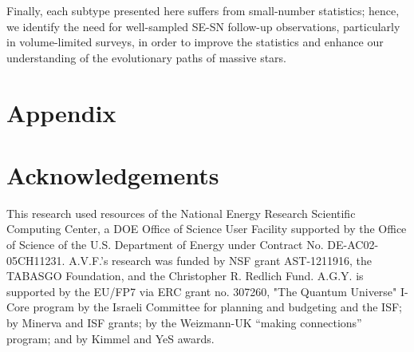 \documentclass[a4paper,fleqn,usenatbib]{mnras}
\begin{document}
Finally, each subtype presented here suffers from small-number statistics; hence, we identify the need for well-sampled SE-SN follow-up observations, particularly in volume-limited surveys, in order to improve the statistics and enhance our understanding of the evolutionary paths of massive stars.


\section{Appendix}


\section*{Acknowledgements}
This research used resources of the National Energy Research Scientific Computing Center, a DOE Office of Science User Facility supported by the Office of Science of the U.S. Department of Energy under Contract No. DE-AC02-05CH11231. 
A.V.F.'s research was funded by NSF grant AST-1211916, the TABASGO Foundation, and the Christopher R. Redlich Fund. A.G.Y. is supported by the EU/FP7 via ERC grant no. 307260, "The Quantum Universe" I-Core program by the Israeli Committee for planning and budgeting and the ISF; by Minerva and ISF grants; by the Weizmann-UK “making connections” program; and by Kimmel and YeS awards.









\end{document}
